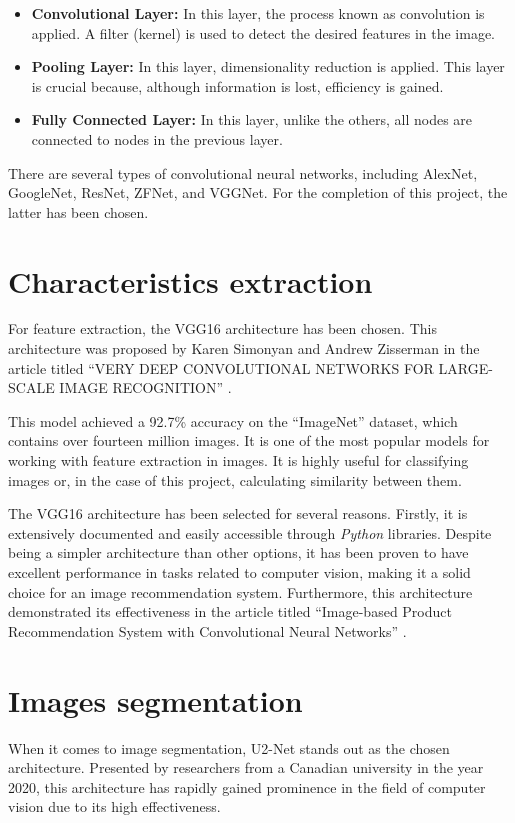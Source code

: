 \documentclass[12pt]{report} %
\begin{document}
\begin{itemize}
	\item \textbf{Convolutional Layer:} In this layer, the process known as convolution is applied. A filter (kernel) is used to detect the desired features in the image.
	\item \textbf{Pooling Layer:} In this layer, dimensionality reduction is applied. This layer is crucial because, although information is lost, efficiency is gained.
	\item \textbf{Fully Connected Layer:} In this layer, unlike the others, all nodes are connected to nodes in the previous layer.
\end{itemize}

There are several types of convolutional neural networks, including AlexNet, GoogleNet, ResNet, ZFNet, and VGGNet. For the completion of this project, the latter has been chosen.

\section*{Characteristics extraction}
For feature extraction, the VGG16 architecture has been chosen. This architecture was proposed by Karen Simonyan and Andrew Zisserman in the article titled ``VERY DEEP CONVOLUTIONAL NETWORKS FOR LARGE-SCALE IMAGE RECOGNITION'' \cite{vgg16-paper}.

This model achieved a 92.7\% accuracy on the ``ImageNet'' dataset, which contains over fourteen million images. It is one of the most popular models for working with feature extraction in images. It is highly useful for classifying images or, in the case of this project, calculating similarity between them.

The VGG16 architecture has been selected for several reasons. Firstly, it is extensively documented and easily accessible through \textit{Python} libraries. Despite being a simpler architecture than other options, it has been proven to have excellent performance in tasks related to computer vision, making it a solid choice for an image recommendation system. Furthermore, this architecture demonstrated its effectiveness in the article titled ``Image-based Product Recommendation System with Convolutional Neural Networks'' \cite{image-based-paper}.
\section*{Images segmentation}
When it comes to image segmentation, U2-Net stands out as the chosen architecture. Presented by researchers from a Canadian university in the year 2020, this architecture has rapidly gained prominence in the field of computer vision due to its high effectiveness.
\end{document}

